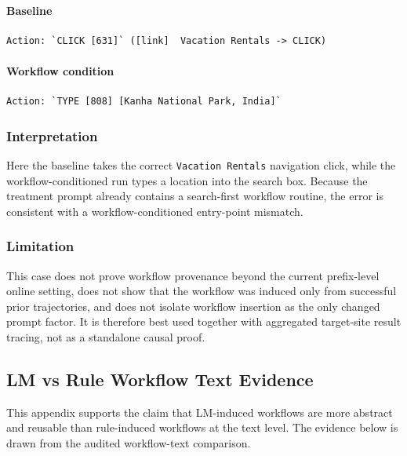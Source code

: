 \paragraph{Baseline}

\begin{verbatim}
Action: `CLICK [631]` ([link]  Vacation Rentals -> CLICK)
\end{verbatim}

\paragraph{Workflow condition}

\begin{verbatim}
Action: `TYPE [808] [Kanha National Park, India]`
\end{verbatim}

\subsubsection{Interpretation}

Here the baseline takes the correct \texttt{Vacation Rentals}
navigation click, while the workflow-conditioned run types a location
into the search box. Because the treatment prompt already contains a
search-first workflow routine, the error is consistent with a
workflow-conditioned entry-point mismatch.

\subsubsection{Limitation}

This case does not prove workflow provenance beyond the current
prefix-level online setting, does not show that the workflow was induced
only from successful prior trajectories, and does not isolate workflow
insertion as the only changed prompt factor. It is therefore best used
together with aggregated target-site result tracing, not as a standalone causal
proof.


\clearpage
\subsection{LM vs Rule Workflow Text Evidence}\label{app:C1}

This appendix supports the claim that LM-induced workflows are more
abstract and reusable than rule-induced workflows at the text level.
The evidence below is drawn from the audited workflow-text comparison.

